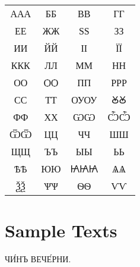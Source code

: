 \documentclass{article}
\begin{document}
{\Huge
\begin{tabular}{cccc}
	{\glyphfont А}{\simple А}{\salt А}	& {\glyphfont Б}{\simple Б} & {\glyphfont В}{\simple В} & {\glyphfont Г}{\simple Г} \\

	{\glyphfont Е}{\simple Е}	& {\glyphfont Ж}{\simple Ж} & {\glyphfont Ѕ}{\simple Ѕ} & {\glyphfont З}{\simple З} \\
	
	{\glyphfont И}{\simple И}	& {\glyphfont Й}{\simple Й} & {\glyphfont І}{\simple І} & {\glyphfont Ї}{\simple Ї} \\

	{\glyphfont К}{\simple К}{\salt К}	& {\glyphfont Л}{\simple Л} & {\glyphfont М}{\simple М} & {\glyphfont Н}{\simple Н} \\

	{\glyphfont О}{\simple О}	& {\glyphfont Ѻ}{\simple Ѻ} & {\glyphfont П}{\simple П} & {\glyphfont Р}{\simple Р}{\salt Р} \\

	{\glyphfont С}{\simple С}	& {\glyphfont Т}{\simple Т} & {\glyphfont ОУ}{\simple ОУ} & {\glyphfont Ꙋ}{\simple Ꙋ} \\

	{\glyphfont Ф}{\simple Ф}	& {\glyphfont Х}{\simple Х} & {\glyphfont Ѡ}{\simple Ѡ} & {\glyphfont Ѽ}{\simple Ѽ} \\

	{\glyphfont Ѿ}{\simple Ѿ}	& {\glyphfont Ц}{\simple Ц} & {\glyphfont Ч}{\simple Ч} & {\glyphfont Ш}{\simple Ш} \\

	{\glyphfont Щ}{\simple Щ}	& {\glyphfont Ъ}{\simple Ъ} & {\glyphfont Ы}{\simple Ы} & {\glyphfont Ь}{\simple Ь} \\

	{\glyphfont Ѣ}{\simple Ѣ}	& {\glyphfont Ю}{\simple Ю} & {\glyphfont Ꙗ}{\simple Ꙗ}{\salt Ꙗ} & {\glyphfont Ѧ}{\simple Ѧ} \\

	{\glyphfont Ѯ}{\simple Ѯ}	& {\glyphfont Ѱ}{\simple Ѱ} & {\glyphfont Ѳ}{\simple Ѳ} & {\glyphfont Ѵ}{\simple Ѵ} \\
\end{tabular}
}

\section{Sample Texts}

{\Huge \glyphfont ЧИ́НЪ ВЕЧЕ́РНИ.} \\
\end{document}
